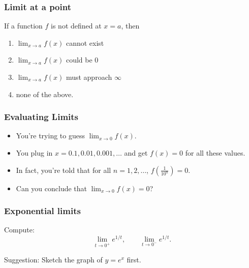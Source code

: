 \documentclass[14pt]{beamer}
\begin{document}

	\begin{frame}
		\frametitle{Limit at a point}

		If a function $f$ is not defined at $x=a$, then
		\begin{enumerate}
			\item $\displaystyle{\lim_{x\rightarrow a} f(x)}$ cannot exist

			\item $\displaystyle{\lim_{x\rightarrow a} f(x)}$ could be $0$

			\item $\displaystyle{\lim_{x\rightarrow a} f(x)}$ must approach $\infty$

			\item none of the above.
		\end{enumerate}
	\end{frame}


	\begin{frame}
		\frametitle{Evaluating Limits}

		\begin{itemize}
			\item You're trying to guess $\displaystyle{\lim_{x \rightarrow 0} f(x)}$.

			\item You plug in $x=0.1, 0.01, 0.001, \dots$ and get $f(x)=0$ for all these
				values.

			\item In fact, you're told that for all $n=1, 2, \dots$, $\displaystyle{f\left(\frac{1}{10^{n}}\right)}
				=0$. \\

			\item Can you conclude that $\displaystyle \lim_{x \rightarrow 0}f(x)=0$?
		\end{itemize}
	\end{frame}


	\begin{frame}
		\frametitle{Exponential limits}

		Compute:
		\[
			\lim_{t \to 0^+}e^{1/t}, \quad \quad \lim_{t \to 0^-}e^{1/t}.
		\]

		Suggestion: Sketch the graph of $\displaystyle y=e^{x}$ first.
	\end{frame}
\end{document}

